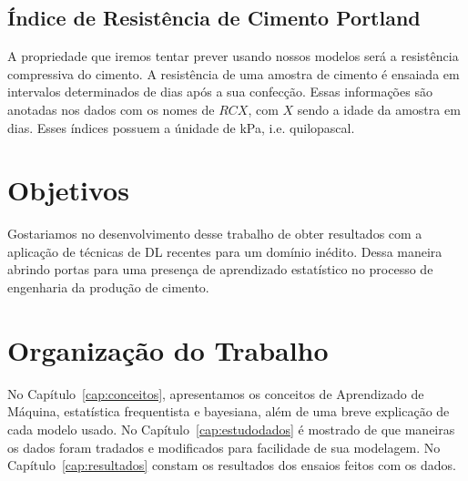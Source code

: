 \subsection{Índice de Resistência de Cimento Portland}

A propriedade que iremos tentar prever usando nossos modelos será a resistência
compressiva do cimento. A resistência de uma amostra de cimento é ensaiada em
intervalos determinados de dias após a sua confecção. Essas informações são
anotadas nos dados com os nomes de $RCX$, com $X$ sendo a idade da amostra em
dias. Esses índices possuem a únidade de kPa, i.e. quilopascal.

\section{Objetivos}
\label{sec:objetivo}

Gostariamos no desenvolvimento desse trabalho de obter resultados com a
aplicação de técnicas de DL recentes para um domínio inédito. Dessa maneira
abrindo portas para uma presença de aprendizado estatístico no processo de
engenharia da produção de cimento.


\section{Organização do Trabalho}
\label{sec:organizacao_trabalho}

No Capítulo~\ref{cap:conceitos}, apresentamos os conceitos de Aprendizado de
Máquina, estatística frequentista e bayesiana, além de uma breve explicação
de cada modelo usado. No Capítulo~\ref{cap:estudodados} é mostrado de que
maneiras os dados foram tradados e modificados para facilidade de sua modelagem.
No Capítulo~\ref{cap:resultados} constam os resultados dos ensaios feitos com os dados. 



